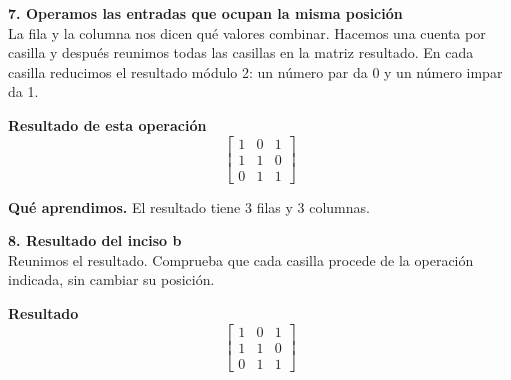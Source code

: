 \documentclass[11pt,a4paper,landscape]{article}
\begin{document}
\noindent\begin{minipage}{\linewidth}\textbf{7. Operamos las entradas que ocupan la misma posición}\\[2pt]La fila y la columna nos dicen qué valores combinar. Hacemos una cuenta por casilla y después reunimos todas las casillas en la matriz resultado. En cada casilla reducimos el resultado módulo 2: un número par da 0 y un número impar da 1.
\par{}\par\smallskip
\par\smallskip \textbf{Resultado de esta operación}\[\begin{bmatrix}1 & 0 & 1\\1 & 1 & 0\\0 & 1 & 1\end{bmatrix}\]
\par\smallskip\textbf{Qué aprendimos.} El resultado tiene 3 filas y 3 columnas.
\end{minipage}\par\medskip
\noindent\begin{minipage}{\linewidth}\textbf{8. Resultado del inciso b}\\[2pt]Reunimos el resultado. Comprueba que cada casilla procede de la operación indicada, sin cambiar su posición.
\par\smallskip \textbf{Resultado}\[\begin{bmatrix}1 & 0 & 1\\1 & 1 & 0\\0 & 1 & 1\end{bmatrix}\]
\end{minipage}\par\medskip
\end{document}
